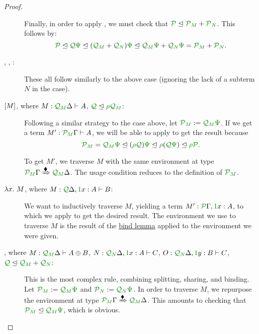\documentclass[submission,copyright,creativecommons]{eptcs}
\begin{document}
\begin{proof}
\begin{description}
      Finally, in order to apply , we must check that
      $\resctx P \subres \resctx P_{\rescomment M} + \resctx P_{\rescomment N}$.
      This follows by:
      \[
      \resctx P
      \subres \resctx Q\rescomment\Psi
      \subres (\resctx Q_{\rescomment M} + \resctx Q_{\rescomment N})
      \rescomment\Psi
      \subres \resctx Q_{\rescomment M}\rescomment\Psi +
      \resctx Q_{\rescomment N}\rescomment\Psi
      = \resctx P_{\rescomment M} + \resctx P_{\rescomment N}.
      \]
    \item[\TirName{$\fun{}{}$-E}, \TirName{$\tensorOne{}$-E},
      \TirName{$\sumTZero$-E}:]
      These all follow similarly to the above case (ignoring the lack of a
      subterm $N$ in the  case).
    \item[\TirName{$\excl{\rho}{}$-I} $\left[M\right]$, where
      $M : \ctx{\Delta}{Q_{\mathnormal M}} \vdash A$,
      $\resctx Q \subres \rescomment\rho \resctx Q_{\rescomment M}$:]
      Following a similar strategy to the case above, let
      $\resctx P_{\rescomment M} := \resctx Q_{\rescomment M}\rescomment\Psi$.
      If we get a term $M' : \ctx{\Gamma}{P_{\mathnormal M}} \vdash A$, we will
      be able to apply  to get the result because
      \[
      \resctx P_{\rescomment M} = \resctx Q_{\rescomment M}\rescomment\Psi
      \subres (\rescomment\rho\resctx Q)\rescomment\Psi
      \subres \rescomment\rho(\resctx Q\rescomment\Psi)
      \subres \rescomment\rho\resctx P.
      \]

      To get $M'$, we traverse $M$ with the same environment at type
      $\ctx{\Gamma}{P_{\mathnormal M}}
      \subst{\kitrel} \ctx{\Delta}{Q_{\mathnormal M}}$.
      The usage condition reduces to the definition of
      $\resctx P_{\rescomment M}$.
    \item[\TirName{$\fun{}{}$-I} $\lambda x.~M$, where
      $M : \ctx{\Delta}{Q}, \ctxvar{x}{A}{1} \vdash B$:]
      We want to inductively traverse $M$, yielding a term
      $M' : \ctx{\Gamma}{P}, \ctxvar{x}{A}{1}$, to which we apply
       to get the desired result.
      The environment we use to traverse $M$ is the result of the
      \hyperref[lem:bind]{bind lemma} applied to the environment we were given.
    \item[\TirName{$\sumT{}{}$-E}, where
      $M : \ctx{\Delta}{Q_{\mathnormal M}} \vdash \sumT{A}{B}$,
      $N : \ctx{\Delta}{Q_{\mathnormal N}}, \ctxvar{x}{A}{1} \vdash C$,
      $O : \ctx{\Delta}{Q_{\mathnormal N}}, \ctxvar{y}{B}{1} \vdash C$,
      $\resctx Q \subres
      \resctx Q_{\rescomment M} + \resctx Q_{\rescomment N}$:]
      This is the most complex rule, combining splitting, sharing, and binding.
      Let
      $\resctx P_{\rescomment M} := \resctx Q_{\rescomment M}\rescomment\Psi$
      and
      $\resctx P_{\rescomment N} := \resctx Q_{\rescomment N}\rescomment\Psi$.
      In order to traverse $M$, we repurpose the environment at type
      $\ctx{\Gamma}{P_{\mathnormal M}}
      \subst{\kitrel} \ctx{\Delta}{Q_{\mathnormal M}}$.
      This amounts to checking that
      $\resctx P_{\rescomment M} \subres
      \resctx Q_{\rescomment M}\rescomment\Psi$, which is obvious.


\end{description}
\end{proof}
\end{document}
